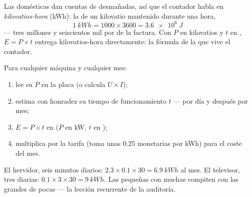 \begin{definition}\label{def:g9:electric-power-energy:kwh}
Las  domésticas dan cuentas de  desmañadas, así que el
contador habla en \emph{kilovatios-hora}
(\unit{kWh}): la  de un kilovatio mantenido durante una
hora,
\[
\qty{1}{kWh} = 1000 \times 3600 = \qty{3.6e6}{J}
\]
--- tres millones y seiscientos mil  por
 de la factura. Con $P$ en kilovatios y $t$ en
, $E = P \times t$ entrega kilovatios-hora directamente: la
fórmula de la que vive el contador.
\end{definition}

\begin{method}\label{met:g9:electric-power-energy:audit}
Para cualquier máquina y cualquier mes:
\begin{enumerate}
  \item lee su  $P$ en la placa (o calcula $U \times
        I$);
  \item estima con honradez su tiempo de funcionamiento $t$ --- por
        día y después por mes;
  \item $E = P \times t$ en  ($P$ en \unit{kW},
        $t$ en );
  \item multiplica por la tarifa (toma unas $0.25$
         monetarias por \unit{kWh}) para el coste del
        mes.
\end{enumerate}
El hervidor, seis minutos diarios: $2.3 \times 0.1 \times 30 =
\qty{6.9}{kWh}$ al mes. El televisor, tres  diarias: $0.1
\times 3 \times 30 = \qty{9}{kWh}$. Las  pequeñas con
muchas  compiten con las grandes de pocas --- la lección
recurrente de la auditoría.
\end{method}

